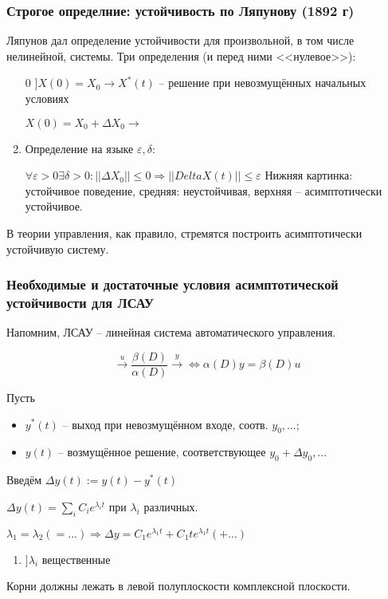 \documentclass[main.tex]{subfiles}
\begin{document}
\subsubsection{Строгое определние: устойчивость по Ляпунову (1892 г)}

Ляпунов дал определение устойчивости для произвольной, в том числе нелинейной, системы.
Три определения (и перед ними <<нулевое>>):

\begin{enumerate}
    \item[0] $ ] X(0) = X_0 \to  X^*(t) $ -- решение при невозмущённых начальных условиях

    $ X(0) = X_0 + \Delta X_0 \to $ %
    \item Определение на языке $\varepsilon, \delta$:

    $ \forall \varepsilon > 0 \exists \delta > 0 : ||\Delta X_0|| \le 0 \Rightarrow ||Delta X(t)|| \le \varepsilon $
    Нижняя картинка: устойчивое поведение, средняя: неустойчивая, верхняя -- асимптотически устойчивое.
\end{enumerate}

В теории управления, как правило, стремятся построить асимптотически устойчивую систему.

\subsubsection{Необходимые и достаточные условия асимптотической устойчивости для ЛСАУ}

Напомним, ЛСАУ -- линейная система автоматического управления.

$$ \xrightarrow{u} \boxed{\frac{\beta(D)}{\alpha(D)}} \xrightarrow{y} \Leftrightarrow \alpha(D)y=\beta(D)u $$

Пусть
\begin{itemize}[noitemsep]
    \item $y^*(t)$ -- выход при невозмущённом входе, соотв. $y_0, ...$;
    \item $y(t) $ -- возмущённое решение, соответствующее $y_0 + \Delta y_0, ...$
\end{itemize}

Введём $ \Delta y(t) := y(t) - y^*(t) $


$ \Delta y(t) = \sum_i C_i e^{\lambda_i t} $ при $ \lambda_i $ различных.

$\lambda_1 = \lambda_2 (= ...) \Rightarrow \Delta y = C_1 e^{\lambda_1 t} + C_1 t e^{\lambda_1 t} (+ ...) $

\begin{enumerate}[noitemsep]
    \item $ ] \lambda_i $ вещественные %
\end{enumerate}

Корни должны лежать в левой полуплоскости комплексной плоскости.
\end{document}
